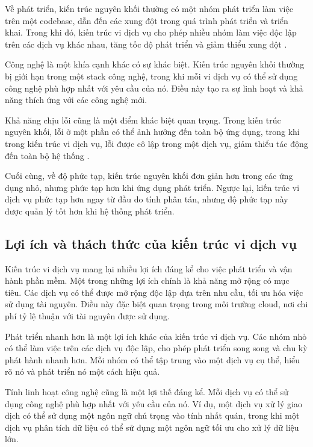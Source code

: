 Về phát triển, kiến trúc nguyên khối thường có một nhóm phát triển làm việc
trên một codebase, dẫn đến các xung đột trong quá trình phát triển và triển
khai. Trong khi đó, kiến trúc vi dịch vụ cho phép nhiều nhóm làm việc độc lập
trên các dịch vụ khác nhau, tăng tốc độ phát triển và giảm thiểu xung đột \cite{richardson2019}.

Công nghệ là một khía cạnh khác có sự khác biệt. Kiến trúc nguyên khối thường
bị giới hạn trong một stack công nghệ, trong khi mỗi vi dịch vụ có thể sử
dụng công nghệ phù hợp nhất với yêu cầu của nó. Điều này tạo ra sự linh hoạt và
khả năng thích ứng với các công nghệ mới.

Khả năng chịu lỗi cũng là một điểm khác biệt quan trọng. Trong kiến trúc nguyên
khối, lỗi ở một phần có thể ảnh hưởng đến toàn bộ ứng dụng, trong khi trong
kiến trúc vi dịch vụ, lỗi được cô lập trong một dịch vụ, giảm thiểu tác động
đến toàn bộ hệ thống \cite{fowler2014}.

Cuối cùng, về độ phức tạp, kiến trúc nguyên khối đơn giản hơn trong các ứng
dụng nhỏ, nhưng phức tạp hơn khi ứng dụng phát triển. Ngược lại, kiến trúc
vi dịch vụ phức tạp hơn ngay từ đầu do tính phân tán, nhưng độ phức tạp này
được quản lý tốt hơn khi hệ thống phát triển.

\subsection{Lợi ích và thách thức của kiến trúc vi dịch vụ}
Kiến trúc vi dịch vụ mang lại nhiều lợi ích đáng kể cho việc phát triển và
vận hành phần mềm. Một trong những lợi ích chính là khả năng mở rộng có mục
tiêu. Các dịch vụ có thể được mở rộng độc lập dựa trên nhu cầu, tối ưu hóa việc
sử dụng tài nguyên. Điều này đặc biệt quan trọng trong môi trường cloud, nơi
chi phí tỷ lệ thuận với tài nguyên được sử dụng.

Phát triển nhanh hơn là một lợi ích khác của kiến trúc vi dịch vụ. Các nhóm
nhỏ có thể làm việc trên các dịch vụ độc lập, cho phép phát triển song song và
chu kỳ phát hành nhanh hơn. Mỗi nhóm có thể tập trung vào một dịch vụ cụ thể,
hiểu rõ nó và phát triển nó một cách hiệu quả.

Tính linh hoạt công nghệ cũng là một lợi thế đáng kể. Mỗi dịch vụ có thể sử
dụng công nghệ phù hợp nhất với yêu cầu của nó. Ví dụ, một dịch vụ xử lý giao
dịch có thể sử dụng một ngôn ngữ chú trọng vào tính nhất quán, trong khi một
dịch vụ phân tích dữ liệu có thể sử dụng một ngôn ngữ tối ưu cho xử lý dữ liệu
lớn.

